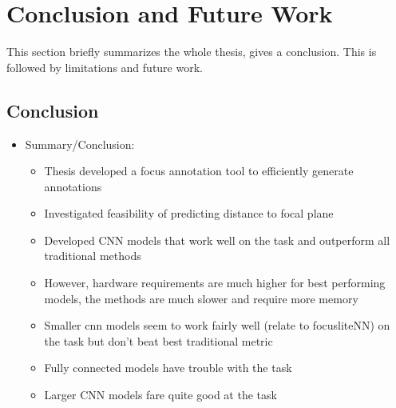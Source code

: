 \chapter{Conclusion and Future Work}
\label{ch:Conclusion}

This section briefly summarizes the whole thesis, gives a conclusion. This is followed by limitations and future work.



\section{Conclusion}
\label{sec:Conclusion:Conclusion}

\begin{itemize}
    \item Summary/Conclusion:
    \begin{itemize}
        \item Thesis developed a focus annotation tool to efficiently generate annotations
        \item Investigated feasibility of predicting distance to focal plane

        \item Developed CNN models that work well on the task and outperform all traditional methods
        \item However, hardware requirements are much higher for best performing models, the methods are much slower and require more memory
        \item Smaller cnn models seem to work fairly well (relate to focusliteNN) on the task but don't beat best traditional metric
        \item Fully connected models have trouble with the task
        \item Larger CNN models fare quite good at the task
    \end{itemize}
\end{itemize}

